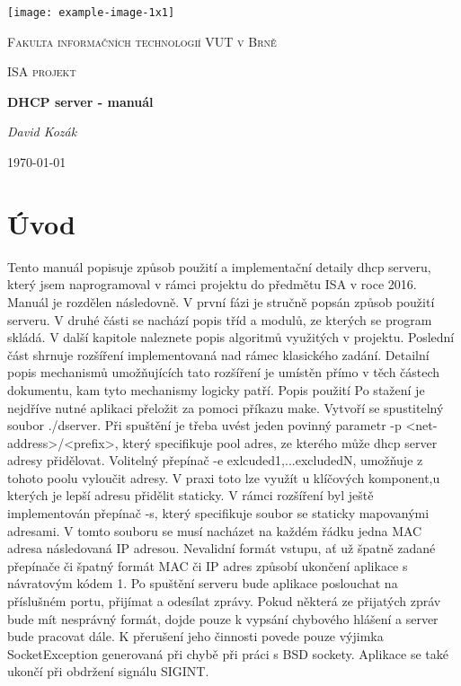 \documentclass[12pt,a4paper]{report}
\begin{document}
\begin{titlepage}
	\centering
	\texttt{[image: example-image-1x1]}\par\vspace{1cm}
	{\scshape\LARGE Fakulta informačních technologií VUT v Brně \par}
	\vspace{1cm}
	{\scshape\Large ISA projekt \par}
	\vspace{1.5cm}
	{\huge\bfseries DHCP server - manuál\par}
	\vspace{2cm}
	{\Large\itshape David Kozák\par}
	\vfill
	\vfill

	{\large \today\par}
\end{titlepage}

\chapter{Úvod}
Tento manuál popisuje způsob použití a implementační detaily dhcp serveru, který jsem naprogramoval v rámci projektu do předmětu ISA v roce 2016.  Manuál je rozdělen následovně. V první fázi je stručně popsán způsob použití serveru.
V druhé části se nachází popis tříd a modulů, ze kterých se program skládá.
V další kapitole naleznete popis algoritmů využitých v projektu.
Poslední část shrnuje rozšíření implementovaná nad rámec klasického zadání. Detailní popis mechanismů umožňujících tato rozšíření je umístěn přímo v těch částech dokumentu, kam tyto mechanismy logicky patří.
Popis použití
Po stažení je nejdříve nutné aplikaci přeložit za pomoci příkazu make. Vytvoří se spustitelný soubor ./dserver. Při spuštění je třeba uvést jeden povinný parametr -p <net-address>/<prefix>,
který specifikuje pool adres, ze kterého může dhcp server adresy přidělovat. Volitelný přepínač -e exlcuded1,...excludedN, umožňuje z tohoto poolu vyloučit adresy. V praxi toto lze využít u klíčových komponent,u kterých je lepší adresu přidělit staticky. V rámci rozšíření byl ještě implementován přepínač -s, který specifikuje soubor se staticky mapovanými adresami. V tomto souboru se musí nacházet na každém řádku jedna MAC adresa následovaná IP adresou. Nevalidní formát vstupu, ať už špatně zadané přepínače či špatný formát MAC či IP adres způsobí ukončení aplikace s návratovým kódem 1.
Po spuštění serveru bude aplikace poslouchat na příslušném portu, přijímat a odesílat zprávy. Pokud některá ze přijatých zpráv bude mít nesprávný formát, dojde pouze k vypsání chybového hlášení a server bude pracovat dále. K přerušení jeho činnosti povede pouze výjimka SocketException generovaná při chybě při práci s BSD sockety. Aplikace se také ukončí při obdržení signálu SIGINT.
\end{document}
